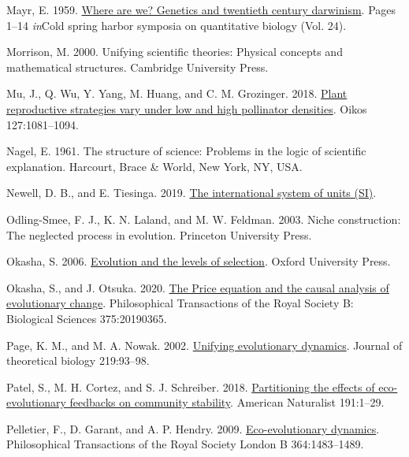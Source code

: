 \documentclass[
]{article}
\newlength{\cslhangindent}
\newenvironment{CSLReferences}[2] %
 {\begin{list}{}{%
  \setlength{\itemindent}{0pt}
  \setlength{\leftmargin}{0pt}
  \setlength{\parsep}{0pt}
  \ifodd #1
   \setlength{\leftmargin}{\cslhangindent}
   \setlength{\itemindent}{-1\cslhangindent}
  \fi
  \setlength{\itemsep}{#2\baselineskip}}}
 {\end{list}}
\begin{document}
\begin{CSLReferences}{0}{0}
Mayr, E. 1959. \href{https://doi.org/10.1101/SQB.1959.024.01.003}{Where
are we? Genetics and twentieth century darwinism}. Pages 1--14
\emph{in}Cold spring harbor symposia on quantitative biology (Vol. 24).

Morrison, M. 2000. Unifying scientific theories: Physical concepts and
mathematical structures. Cambridge University Press.

Mu, J., Q. Wu, Y. Yang, M. Huang, and C. M. Grozinger. 2018.
\href{https://doi.org/10.1111/oik.04711}{Plant reproductive strategies
vary under low and high pollinator densities}. Oikos 127:1081--1094.

Nagel, E. 1961. The structure of science: Problems in the logic of
scientific explanation. Harcourt, Brace \& World, New York, NY, USA.

Newell, D. B., and E. Tiesinga. 2019.
\href{https://doi.org/10.6028/NIST.SP.330-2019}{The international system
of units (SI)}.

Odling-Smee, F. J., K. N. Laland, and M. W. Feldman. 2003. Niche
construction: The neglected process in evolution. Princeton University
Press.

Okasha, S. 2006.
\href{https://doi.org/10.1093/acprof:oso/9780199267972.001.0001}{Evolution
and the levels of selection}. Oxford University Press.

Okasha, S., and J. Otsuka. 2020.
\href{https://doi.org/10.1098/rstb.2019.0365}{{The Price equation and
the causal analysis of evolutionary change}}. Philosophical Transactions
of the Royal Society B: Biological Sciences 375:20190365.

Page, K. M., and M. A. Nowak. 2002.
\href{https://doi.org/10.1006/jtbi.2002.3112}{Unifying evolutionary
dynamics}. Journal of theoretical biology 219:93--98.

Patel, S., M. H. Cortez, and S. J. Schreiber. 2018.
\href{https://doi.org/10.1101/104505}{{Partitioning the effects of
eco-evolutionary feedbacks on community stability}}. American Naturalist
191:1--29.

Pelletier, F., D. Garant, and A. P. Hendry. 2009.
\href{https://doi.org/10.1098/rstb.2009.0027}{Eco-evolutionary
dynamics}. Philosophical Transactions of the Royal Society London B
364:1483--1489.


\end{CSLReferences}
\end{document}
